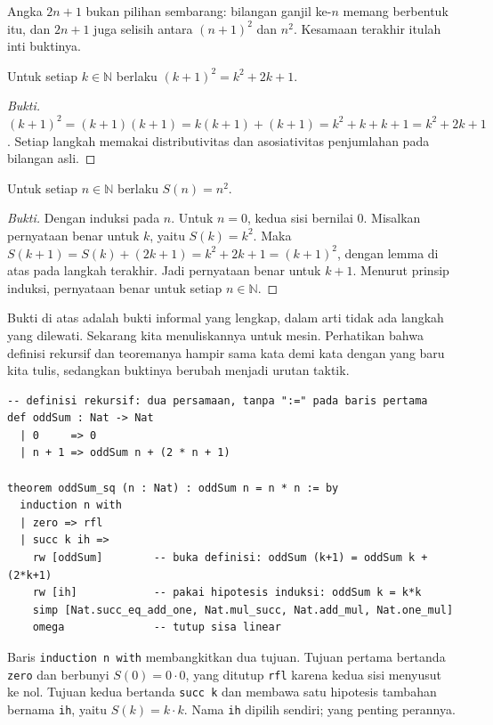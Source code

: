 Angka $2n+1$ bukan pilihan sembarang: bilangan ganjil ke-$n$ memang berbentuk itu, dan
$2n+1$ juga selisih antara $(n+1)^{2}$ dan $n^{2}$. Kesamaan terakhir itulah inti buktinya.

\begin{lemma}
Untuk setiap $k\in\mathbb{N}$ berlaku $(k+1)^{2}=k^{2}+2k+1$.
\end{lemma}

\begin{proof}[Bukti]
$(k+1)^{2}=(k+1)(k+1)=k(k+1)+(k+1)=k^{2}+k+k+1=k^{2}+2k+1$. Setiap langkah memakai
distributivitas dan asosiativitas penjumlahan pada bilangan asli.
\end{proof}

\begin{teorema}
Untuk setiap $n\in\mathbb{N}$ berlaku $S(n)=n^{2}$.
\end{teorema}

\begin{proof}[Bukti]
Dengan induksi pada $n$. Untuk $n=0$, kedua sisi bernilai $0$. Misalkan pernyataan benar untuk
$k$, yaitu $S(k)=k^{2}$. Maka
$S(k+1)=S(k)+(2k+1)=k^{2}+2k+1=(k+1)^{2}$, dengan lemma di atas pada langkah terakhir. Jadi
pernyataan benar untuk $k+1$. Menurut prinsip induksi, pernyataan benar untuk setiap
$n\in\mathbb{N}$.
\end{proof}

Bukti di atas adalah bukti informal yang lengkap, dalam arti tidak ada langkah yang dilewati.
Sekarang kita menuliskannya untuk mesin. Perhatikan bahwa definisi rekursif dan teoremanya hampir
sama kata demi kata dengan yang baru kita tulis, sedangkan buktinya berubah menjadi urutan taktik.

\begin{verbatim}
-- definisi rekursif: dua persamaan, tanpa ":=" pada baris pertama
def oddSum : Nat -> Nat
  | 0     => 0
  | n + 1 => oddSum n + (2 * n + 1)

theorem oddSum_sq (n : Nat) : oddSum n = n * n := by
  induction n with
  | zero => rfl
  | succ k ih =>
    rw [oddSum]        -- buka definisi: oddSum (k+1) = oddSum k + (2*k+1)
    rw [ih]            -- pakai hipotesis induksi: oddSum k = k*k
    simp [Nat.succ_eq_add_one, Nat.mul_succ, Nat.add_mul, Nat.one_mul]
    omega              -- tutup sisa linear
\end{verbatim}

Baris \texttt{induction n with} membangkitkan dua tujuan. Tujuan pertama bertanda \texttt{zero}
dan berbunyi $S(0)=0\cdot 0$, yang ditutup \texttt{rfl} karena kedua sisi menyusut ke nol. Tujuan
kedua bertanda \texttt{succ k} dan membawa satu hipotesis tambahan bernama \texttt{ih}, yaitu
$S(k)=k\cdot k$. Nama \texttt{ih} dipilih sendiri; yang penting perannya.

